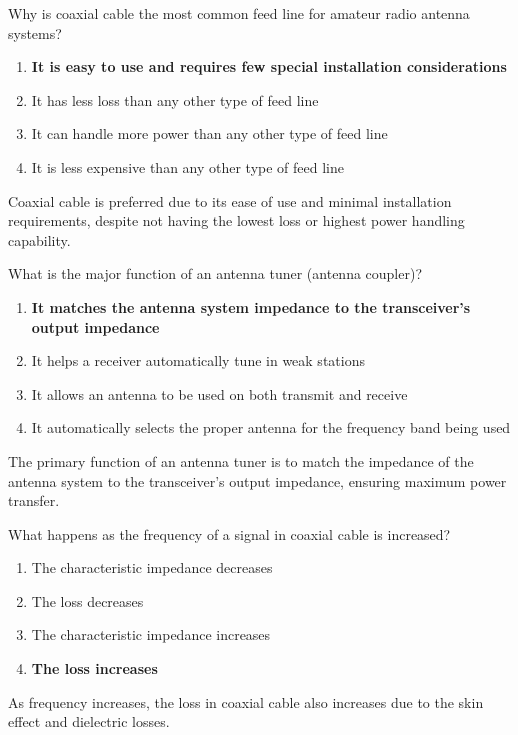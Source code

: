 
\begin{tcolorbox}[colback=gray!10!white,colframe=black!75!black,title={T9B03}]
    Why is coaxial cable the most common feed line for amateur radio antenna systems?
    \begin{enumerate}[label=\Alph*),noitemsep]
        \item \textbf{It is easy to use and requires few special installation considerations}
        \item It has less loss than any other type of feed line
        \item It can handle more power than any other type of feed line
        \item It is less expensive than any other type of feed line
    \end{enumerate}
\end{tcolorbox}
Coaxial cable is preferred due to its ease of use and minimal installation requirements, despite not having the lowest loss or highest power handling capability.


\begin{tcolorbox}[colback=gray!10!white,colframe=black!75!black,title={T9B04}]
    What is the major function of an antenna tuner (antenna coupler)?
    \begin{enumerate}[label=\Alph*),noitemsep]
        \item \textbf{It matches the antenna system impedance to the transceiver's output impedance}
        \item It helps a receiver automatically tune in weak stations
        \item It allows an antenna to be used on both transmit and receive
        \item It automatically selects the proper antenna for the frequency band being used
    \end{enumerate}
\end{tcolorbox}
The primary function of an antenna tuner is to match the impedance of the antenna system to the transceiver's output impedance, ensuring maximum power transfer.


\begin{tcolorbox}[colback=gray!10!white,colframe=black!75!black,title={T9B05}]
    What happens as the frequency of a signal in coaxial cable is increased?
    \begin{enumerate}[label=\Alph*),noitemsep]
        \item The characteristic impedance decreases
        \item The loss decreases
        \item The characteristic impedance increases
        \item \textbf{The loss increases}
    \end{enumerate}
\end{tcolorbox}
As frequency increases, the loss in coaxial cable also increases due to the skin effect and dielectric losses.

